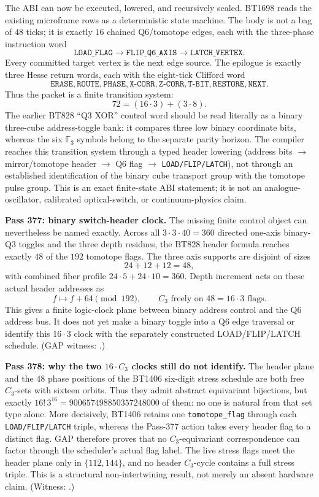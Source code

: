 \documentclass[11pt]{article}
\begin{document}
The ABI can now be executed, lowered, and recursively scaled.  BT1698 reads the
existing microframe rows as a deterministic state machine.  The body is not a
bag of \(48\) ticks; it is exactly \(16\) chained Q6/tomotope edges, each with
the three-phase instruction word
\[
  \texttt{LOAD\_FLAG}\to
  \texttt{FLIP\_Q6\_AXIS}\to
  \texttt{LATCH\_VERTEX}.
\]
Every committed target vertex is the next edge source.  The epilogue is exactly
three Hesse return words, each with the eight-tick Clifford word
\[
  \texttt{ERASE},\texttt{ROUTE},\texttt{PHASE},
  \texttt{X-CORR},\texttt{Z-CORR},\texttt{T-BIT},
  \texttt{RESTORE},\texttt{NEXT}.
\]
Thus the packet is a finite transition system:
\[
  72=(16\cdot3)+(3\cdot8).
\]
The earlier BT828 ``Q3 XOR'' control word should be read literally as a binary
three-cube address-toggle bank: it compares three low binary coordinate bits,
whereas the six $\mathbb F_3$ symbols belong to the separate parity horizon.
The compiler reaches this transition system through a typed header lowering
(address bits $\to$ mirror/tomotope header $\to$ Q6 flag $\to$
\texttt{LOAD/FLIP/LATCH}), not through an established identification of the
binary cube transport group with the tomotope pulse group.  This is an exact
finite-state ABI statement; it is not an analogue-oscillator, calibrated
optical-switch, or continuum-physics claim.

\smallskip
\noindent\textbf{Pass 377: binary switch-header clock.}
The missing finite control object can nevertheless be named exactly.  Across
all $3\cdot3\cdot40=360$ directed one-axis binary-Q3 toggles and the three
depth residues, the BT828 header formula reaches exactly $48$ of the $192$
tomotope flags.  The three axis supports are disjoint of sizes
\[
  24+12+12=48,
\]
with combined fiber profile $24\cdot5+24\cdot10=360$.  Depth increment acts on
these actual header addresses as
\[
  f\longmapsto f+64\pmod{192},
  \qquad C_3\text{ freely on }48=16\cdot3\text{ flags}.
\]
This gives a finite logic-clock plane between binary address control and the
Q6 address bus.  It does not yet make a binary toggle into a Q6 edge
traversal or identify this $16\cdot3$ clock with the separately constructed
LOAD/FLIP/LATCH schedule.  (GAP witness:
.)

\smallskip
\noindent\textbf{Pass 378: why the two $16\cdot C_3$ clocks still do not
identify.}  The header plane and the $48$ phase positions of the BT1406
six-digit stress schedule are both free $C_3$-sets with sixteen orbits.  Thus
they admit abstract equivariant bijections, but exactly
\(16!\,3^{16}=900657498850357248000\) of them: no one is natural from that
set type alone.  More decisively, BT1406 retains one \texttt{tomotope\_flag}
through each \texttt{LOAD/FLIP/LATCH} triple, whereas the Pass-377 action takes
every header flag to a distinct flag.  GAP therefore proves that no
$C_3$-equivariant correspondence can factor through the scheduler's actual
flag label.  The live stress flags meet the header plane only in
\(\{112,144\}\), and no header $C_3$-cycle contains a full stress triple.
This is a structural non-intertwining result, not merely an absent hardware
claim.  (Witness: .)
\end{document}
